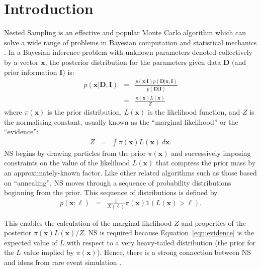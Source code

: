 \documentclass[journal,article,accept,moreauthors,pdftex,12pt,a4paper]{mdpi}
\newcommand{\xx}{\boldsymbol{x}}
\newcommand{\dx}{d\boldsymbol{x}}
\newcommand{\data}{\boldsymbol{D}}
\newcommand{\II}{\boldsymbol{I}}
\begin{document}

\section{Introduction}

Nested Sampling \citep[NS][]{skilling} is an effective and popular
Monte Carlo algorithm which can solve a wide range of problems in Bayesian
computation and statistical mechanics
\citep{2009arXiv0906.3544P, 2014PhRvE..89b2302P, 2015arXiv150303404B}.
In a Bayesian inference problem with unknown parameters denoted collectively
by a vector $\xx$, the
posterior distribution for the parameters given data $\data$ (and prior
information $\II$) is:
\begin{eqnarray}
p(\xx | \data, \II) &=&
\frac{p(\xx | \II)p(\data | \xx, \II)}{p(\data | \II)}\\
&=& \frac{\pi(\xx)L(\xx)}{Z}
\end{eqnarray}
where $\pi(\xx)$ is the prior distribution, $L(\xx)$ is the likelihood
function, and $Z$ is the normalising constant, usually known as the
``marginal likelihood'' or the ``evidence'':
\begin{eqnarray}
Z &=& \int \pi(\xx) L(\xx) \, \dx.\label{eqn:evidence}
\end{eqnarray}
NS begins by drawing particles from the
prior $\pi(\xx)$ and successively imposing constraints on the value of
the likelihood $L(\xx)$ that compress the prior mass by an
approximately-known factor. Like other related algorithms such as those
based on ``annealing'', NS
moves through a sequence of probability distributions beginning from the
prior. This sequence of distributions is defined by
\begin{eqnarray}
p(\xx; \ell) &=& \frac{1}{X(\ell)}\pi(\xx)\mathds{1}\left(L(\xx) > \ell\right).
\end{eqnarray}

This enables the calculation of the marginal likelihood $Z$
and properties of the posterior $\pi(\xx)L(\xx)/Z$.
NS is required because Equation~\ref{eqn:evidence}
is the expected value of $L$ with respect to a very heavy-tailed distribution
(the prior for the $L$ value implied by $\pi(\xx)$). Hence, there is a strong
connection between NS and ideas from rare event simulation \citep{walter}.
\end{document}
